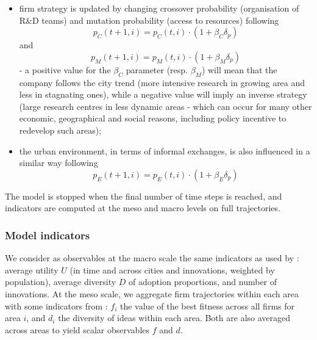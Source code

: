 \documentclass[letterpaper]{article}
\begin{document}
\begin{enumerate}
\begin{itemize}
        \item firm strategy is updated by changing crossover probability (organisation of R\&D teams) and mutation probability (access to resources) following \[p_C(t+1,i) = p_C (t,i)\cdot (1+ \beta_C \delta_p)\] and \[p_M(t+1,i) = p_M (t,i)\cdot (1+ \beta_M \delta_p)\] - a positive value for the $\beta_C$ parameter (resp. $\beta_M$) will mean that the company follows the city trend (more intensive research in growing area and less in stagnating ones), while a negative value will imply an inverse strategy (large research centres in less dynamic areas - which can occur for many other economic, geographical and social reasons, including policy incentive to redevelop such areas);
        \item the urban environment, in terms of informal exchanges, is also influenced in a similar way following
        \[p_E(t+1,i) = p_E (t,i)\cdot (1+ \beta_E \delta_p)\]
    \end{itemize}
\end{enumerate}

The model is stopped when the final number of time steps is reached, and indicators are computed at the meso and macro levels on full trajectories.


\subsubsection{Model indicators}


We consider as observables at the macro scale the same indicators as used by \cite{raimbault2020model}: average utility $U$ (in time and across cities and innovations, weighted by population), average diversity $D$ of adoption proportions, and number of innovations. At the meso scale, we aggregate firm trajectories within each area with some indicators from \citep{raimbault2022innovation}: $f_i$ the value of the best fitness across all firms for area $i$, and $d_i$ the diversity of ideas within each area. Both are also averaged across areas to yield scalar observables $f$ and $d$.
\end{document}
